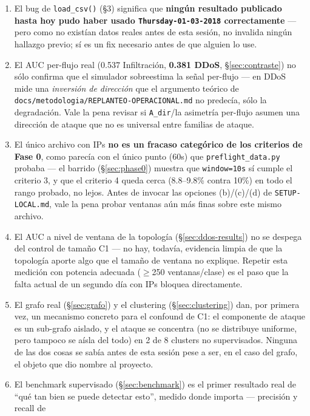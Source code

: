 \documentclass[11pt]{article}
\newcommand{\code}[1]{\texttt{\small #1}}
\begin{document}
\begin{enumerate}[leftmargin=1.4em]
\item El bug de \code{load\_csv()} (\S3) significa que \textbf{ningún resultado publicado
  hasta hoy pudo haber usado \code{Thursday-01-03-2018} correctamente} --- pero como no
  existían datos reales antes de esta sesión, no invalida ningún hallazgo previo; sí es
  un fix necesario antes de que alguien lo use.
\item El AUC per-flujo real (0.537 Infiltración, \textbf{0.381 DDoS}, \S\ref{sec:contraste})
  no sólo confirma que el simulador sobreestima la señal per-flujo --- en DDoS mide una
  \emph{inversión de dirección} que el argumento teórico de
  \code{docs/metodologia/REPLANTEO-OPERACIONAL.md} no predecía, sólo la degradación. Vale
  la pena revisar si \code{A\_dir}/la asimetría per-flujo asumen una dirección de ataque
  que no es universal entre familias de ataque.
\item El único archivo con IPs \textbf{no es un fracaso categórico de los criterios de
  Fase 0}, como parecía con el único punto (60s) que \code{preflight\_data.py} probaba
  --- el barrido (\S\ref{sec:phase0}) muestra que \code{window=10s} sí cumple el criterio
  3, y que el criterio 4 queda cerca (8.8--9.8\% contra 10\%) en todo el rango probado, no
  lejos. Antes de invocar las opciones (b)/(c)/(d) de \code{SETUP-LOCAL.md}, vale la pena
  probar ventanas aún más finas sobre este mismo archivo.
\item El AUC a nivel de ventana de la topología (\S\ref{sec:ddos-results}) no se despega
  del control de tamaño C1 --- no hay, todavía, evidencia limpia de que la topología
  aporte algo que el tamaño de ventana no explique. Repetir esta medición con potencia
  adecuada ($\geq$250 ventanas/clase) es el paso que la falta actual de un segundo día con
  IPs bloquea directamente.
\item El grafo real (\S\ref{sec:grafo}) y el clustering (\S\ref{sec:clustering}) dan, por
  primera vez, un mecanismo concreto para el confound de C1: el componente de ataque es un
  sub-grafo aislado, y el ataque se concentra (no se distribuye uniforme, pero tampoco se
  aísla del todo) en 2 de 8 clusters no supervisados. Ninguna de las dos cosas se sabía
  antes de esta sesión pese a ser, en el caso del grafo, el objeto que dio nombre al
  proyecto.
\item El benchmark supervisado (\S\ref{sec:benchmark}) es el primer resultado real de
  ``qué tan bien se puede detectar esto'', medido donde importa --- precisión y recall de

\end{enumerate}
\end{document}
